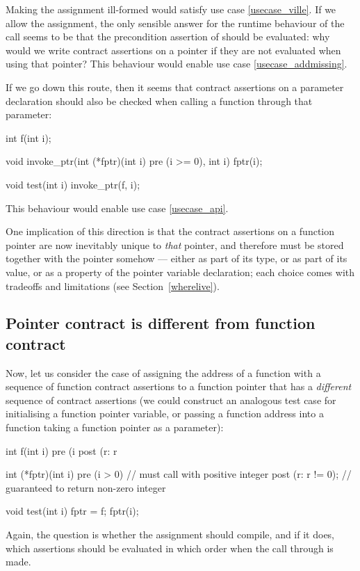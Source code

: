 Making the assignment ill-formed would satisfy use case \ref{usecase_ville}. If we allow the assignment, the only sensible answer for the runtime behaviour of the call seems to be that the precondition assertion of  should be evaluated: why would we write contract assertions on a pointer if they are not evaluated when using that pointer? This behaviour would enable use case \ref{usecase_addmissing}.

If we go down this route, then it seems that contract assertions on a parameter declaration should also be checked when calling a function through that parameter:
\begin{codeblock}
int f(int i);

void invoke_ptr(int (*fptr)(int i) pre (i >= 0), int i) {
  fptr(i);
}

void test(int i) {
  invoke_ptr(f, i);
}
\end{codeblock}
This behaviour would enable use case \ref{usecase_api}.

One implication of this direction is that the contract assertions on a function pointer are now inevitably unique to \emph{that} pointer, and therefore must be stored together with the pointer somehow --- either as part of its type, or as part of its value, or as a property of the pointer variable declaration; each choice comes with  tradeoffs and limitations (see Section~\ref{wherelive}).
 

\subsection{Pointer contract is different from function contract}
\label{ptrfundifferent}

Now, let us consider the case of assigning the address of a function with a sequence of function contract assertions to a function pointer  that has a \emph{different} sequence of contract assertions (we could construct an analogous test case for initialising a function pointer variable, or passing a function address into a function taking a function pointer as a parameter):
\begin{codeblock}
int f(int i)
  pre (i %
  post (r: r %

int (*fptr)(int i)
  pre (i > 0)           // must call with positive integer
  post (r: r != 0);     // guaranteed to return non-zero integer

void test(int i) {
  fptr = f; 
  fptr(i);   
}
\end{codeblock}
Again, the question is whether the assignment should compile, and if it does, which assertions should be evaluated in which order when the call through  is made.

